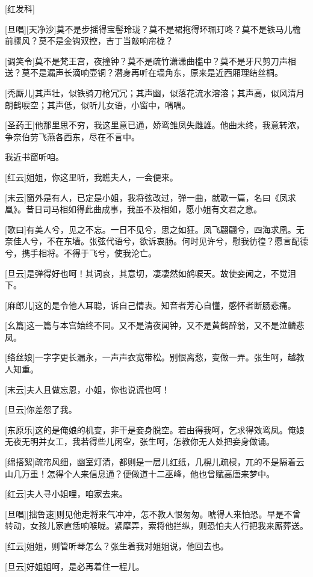 \documentclass{book}
\begin{document}
[红发科]

[旦唱][天净沙]莫不是步摇得宝髻玲珑？莫不是裙拖得环珮玎咚？莫不是铁马儿檐前骤风？莫不是金钩双控，吉丁当敲响帘栊？

[调笑令]莫不是梵王宫，夜撞钟？莫不是疏竹潇潇曲槛中？莫不是牙尺剪刀声相送？莫不是漏声长滴响壶铜？潜身再听在墙角东，原来是近西厢理结丝桐。

[秃厮儿]其声壮，似铁骑刀枪冗冗；其声幽，似落花流水溶溶；其声高，似风清月朗鹤唳空；其声低，似听儿女语，小窗中，喁喁。

[圣药王]他那里思不穷，我这里意已通，娇鸾雏凤失雌雄。他曲未终，我意转浓，争奈伯劳飞燕各西东，尽在不言中。

我近书窗听咱。

[红云]姐姐，你这里听，我瞧夫人，一会便来。

[末云]窗外是有人，已定是小姐，我将弦改过，弹一曲，就歌一篇，名曰《凤求凰》。昔日司马相如得此曲成事，我虽不及相如，愿小姐有文君之意。

[歌曰]有美人兮，见之不忘。一日不见兮，思之如狂。凤飞翩翩兮，四海求凰。无奈佳人兮，不在东墙。张弦代语兮，欲诉衷肠。何时见许兮，慰我彷徨？愿言配德兮，携手相将。不得于飞兮，使我沦亡。

[旦云]是弹得好也呵！其词哀，其意切，凄凄然如鹤唳天。故使妾闻之，不觉泪下。

[麻郎儿]这的是令他人耳聪，诉自己情衷。知音者芳心自懂，感怀者断肠悲痛。

[幺篇]这一篇与本宫始终不同。又不是清夜闻钟，又不是黄鹤醉翁，又不是泣麟悲凤。

[络丝娘]一字字更长漏永，一声声衣宽带松。别恨离愁，变做一弄。张生呵，越教人知重。

[末云]夫人且做忘恩，小姐，你也说谎也呵！

[旦云]你差怨了我。

[东原乐]这的是俺娘的机变，非干是妾身脱空。若由得我呵，乞求得效鸾凤。俺娘无夜无明并女工，我若得些儿闲空，张生呵，怎教你无人处把妾身做诵。

[绵搭絮]疏帘风细，幽室灯清，都则是一层儿红纸，几榥儿疏棂，兀的不是隔着云山几万重！怎得个人来信息通？便做道十二巫峰，他也曾赋高唐来梦中。

[红云]夫人寻小姐哩，咱家去来。

[旦唱][拙鲁速]则见他走将来气冲冲，怎不教人恨匆匆。唬得人来怕恐。早是不曾转动，女孩儿家直恁响喉咙。紧摩弄，索将他拦纵，则恐怕夫人行把我来厮葬送。

[红云]姐姐，则管听琴怎么？张生着我对姐姐说，他回去也。

[旦云]好姐姐呵，是必再着住一程儿。
\end{document}
